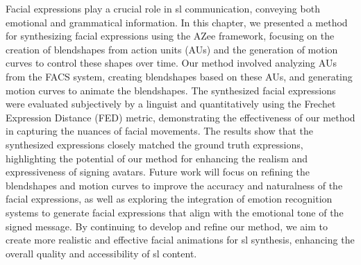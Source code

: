 \documentclass[../../main]{subfiles}
\begin{document}
Facial expressions play a crucial role in \gls{sl} communication, conveying both emotional and grammatical information. In this chapter, we presented a method for synthesizing facial expressions using the AZee framework, focusing on the creation of blendshapes from action units (AUs) and the generation of motion curves to control these shapes over time. Our method involved analyzing AUs from the FACS system, creating blendshapes based on these AUs, and generating motion curves to animate the blendshapes. The synthesized facial expressions were evaluated subjectively by a linguist and quantitatively using the Frechet Expression Distance (FED) metric, demonstrating the effectiveness of our method in capturing the nuances of facial movements. The results show that the synthesized expressions closely matched the ground truth expressions, highlighting the potential of our method for enhancing the realism and expressiveness of signing avatars. Future work will focus on refining the blendshapes and motion curves to improve the accuracy and naturalness of the facial expressions, as well as exploring the integration of emotion recognition systems to generate facial expressions that align with the emotional tone of the signed message. By continuing to develop and refine our method, we aim to create more realistic and effective facial animations for \gls{sl} synthesis, enhancing the overall quality and accessibility of \gls{sl} content.
\end{document}

